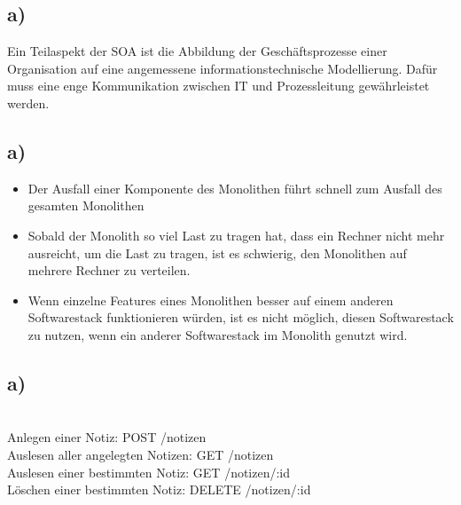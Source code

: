 \documentclass[ngerman]{fbi-aufgabenblatt}
\begin{document}
	\subsection{a)} Ein Teilaspekt der SOA ist die Abbildung der Geschäftsprozesse einer Organisation auf eine angemessene informationstechnische Modellierung. Dafür muss eine enge Kommunikation zwischen IT und Prozessleitung gewährleistet werden.
	\subsection{a)}
	\begin{itemize}
		\item  Der Ausfall einer Komponente des Monolithen führt schnell zum Ausfall des gesamten Monolithen
		\item Sobald der Monolith so viel Last zu tragen hat, dass ein Rechner nicht mehr ausreicht, um die Last zu tragen, ist es schwierig, den Monolithen auf mehrere Rechner zu verteilen.
		\item Wenn einzelne Features eines Monolithen besser auf einem anderen Softwarestack funktionieren würden, ist es nicht möglich, diesen Softwarestack zu nutzen, wenn ein anderer Softwarestack im Monolith genutzt wird.
	\end{itemize}
	\subsection{a)} \\
	Anlegen einer Notiz: POST /notizen \\
	Auslesen aller angelegten Notizen: GET /notizen \\
	Auslesen einer bestimmten Notiz: GET /notizen/:id \\
	Löschen einer bestimmten Notiz: DELETE /notizen/:id
	
	
\end{document}
